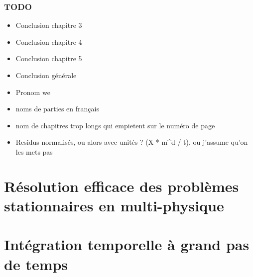 



\makeflyleaf
{}

\tableofcontents
{}



\section*{TODO}
\begin{itemize}
  \item Conclusion chapitre 3
  \item Conclusion chapitre 4
  \item Conclusion chapitre 5
  \item Conclusion générale
  \item Pronom we
  \item noms de parties en français
  \item nom de chapitres trop longs qui empietent sur le numéro de page
  \item Residus normalisés, ou alors avec unités ? (X * m^d / t), ou j'assume qu'on les mets pas
\end{itemize}


\part{Résolution efficace des problèmes stationnaires en multi-physique}

  

  

  

\part{Intégration temporelle à grand pas de temps}

    

    








